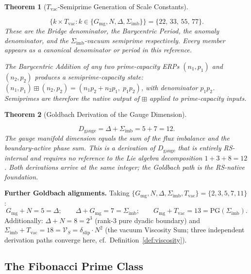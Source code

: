 \documentclass[11pt, letterpaper]{article}
\newcommand{\bplus}{\boxplus}
\newcommand{\Dg}{D_{\mathrm{gauge}}}
\newcommand{\Sigimb}{\Sigma_{\mathrm{imb}}}
\newcommand{\VS}{\mathcal{V}_S}
\newcommand{\PG}{\mathrm{PG}}
\theoremstyle{definition}
\theoremstyle{plain}
\newtheorem{theorem}{Theorem}[section]
\begin{document}
\begin{theorem}[$T_{\mathrm{vac}}$-Semiprime Generation of Scale Constants]
\label{thm:semiprime}
\begin{rsbox}
\[
\{k\times T_{\mathrm{vac}}:k\in\{G_{\mathrm{mg}},N,\Delta,\Sigimb\}\}
= \{22,\,33,\,55,\,77\}.
\]
These are the Bridge denominator, the Barycentric Period, the anomaly
denominator, and the $\Sigimb$-vacuum semiprime respectively.  Every
member appears as a canonical denominator or period in this reference.

The Barycentric Addition of any two prime-capacity ERPs $(n_1,p_1)$ and
$(n_2,p_2)$ produces a semiprime-capacity state:
$(n_1,p_1)\bplus(n_2,p_2)=(n_1 p_2+n_2 p_1,\;p_1 p_2)$,
with denominator $p_1 p_2$.  Semiprimes are therefore the native output of
$\bplus$ applied to prime-capacity inputs.
\end{rsbox}
\end{theorem}

\begin{theorem}[Goldbach Derivation of the Gauge Dimension]
\label{thm:goldbach-dg}
\begin{rsbox}
\[
\Dg = \Delta+\Sigimb = 5+7 = 12.
\]
The gauge manifold dimension equals the sum of the flux imbalance and the
boundary-active phase sum.  This is a derivation of $\Dg$ that is entirely
RS-internal and requires no reference to the Lie algebra decomposition
$1+3+8=12$.  Both derivations arrive at the same integer; the Goldbach path
is the RS-native foundation.
\end{rsbox}
\end{theorem}

\begin{observebox}
\textbf{Further Goldbach alignments.}
Taking $\{G_{\mathrm{mg}},N,\Delta,\Sigimb,T_{\mathrm{vac}}\}=\{2,3,5,7,11\}$:
\[
G_{\mathrm{mg}}+N=5=\Delta;\qquad
\Delta+G_{\mathrm{mg}}=7=\Sigimb;\qquad
G_{\mathrm{mg}}+T_{\mathrm{vac}}=13=\PG(\Sigimb).
\]
Additionally: $\Delta+N=8=2^3$ (rank-3 pure dyadic boundary) and
$\Sigimb+T_{\mathrm{vac}}=18=\VS=\delta_{\mathrm{slip}}\cdot N^2$ (the
vacuum Viscosity Sum; three independent derivation paths converge here,
cf.\ Definition~\ref{def:viscosity}).
\end{observebox}

\subsection{The Fibonacci Prime Class}\label{sec:fib-primes}
\end{document}
